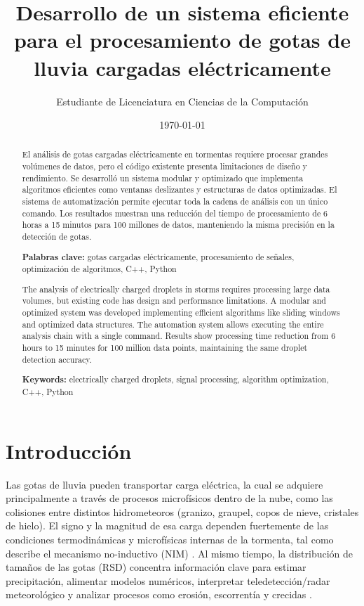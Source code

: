 \documentclass[12pt,a4paper]{article}
\title{\textbf{Desarrollo de un sistema eficiente para el procesamiento de gotas de lluvia cargadas eléctricamente}}
\author{Estudiante de Licenciatura en Ciencias de la Computación}
\date{\today}
\begin{document}
\onehalfspacing

\maketitle

\begin{abstract}
    El análisis de gotas cargadas eléctricamente en tormentas requiere procesar grandes volúmenes de datos, pero el código existente presenta limitaciones de diseño y rendimiento. Se desarrolló un sistema modular y optimizado que implementa algoritmos eficientes como ventanas deslizantes y estructuras de datos optimizadas. El sistema de automatización permite ejecutar toda la cadena de análisis con un único comando. Los resultados muestran una reducción del tiempo de procesamiento de 6 horas a 15 minutos para 100 millones de datos, manteniendo la misma precisión en la detección de gotas.

    \textbf{Palabras clave:} gotas cargadas eléctricamente, procesamiento de señales, optimización de algoritmos, C++, Python
\end{abstract}

\begin{abstract}
    The analysis of electrically charged droplets in storms requires processing large data volumes, but existing code has design and performance limitations. A modular and optimized system was developed implementing efficient algorithms like sliding windows and optimized data structures. The automation system allows executing the entire analysis chain with a single command. Results show processing time reduction from 6 hours to 15 minutes for 100 million data points, maintaining the same droplet detection accuracy.

    \textbf{Keywords:} electrically charged droplets, signal processing, algorithm optimization, C++, Python
\end{abstract}

\tableofcontents
\newpage

\section{Introducción}
\lhead{}

Las gotas de lluvia pueden transportar carga eléctrica, la cual se adquiere principalmente a través de procesos microfísicos dentro de la nube, como las colisiones entre distintos hidrometeoros (granizo, graupel, copos de nieve, cristales de hielo). El signo y la magnitud de esa carga dependen fuertemente de las condiciones termodinámicas y microfísicas internas de la tormenta, tal como describe el mecanismo no-inductivo (NIM) \cite{avila2022}. Al mismo tiempo, la distribución de tamaños de las gotas (RSD) concentra información clave para estimar precipitación, alimentar modelos numéricos, interpretar teledetección/radar meteorológico y analizar procesos como erosión, escorrentía y crecidas \cite{martinez2023}.
\end{document}
